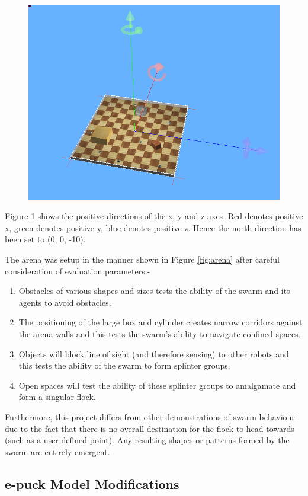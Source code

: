 \begin{figure}[!h]
	\centering
	\includegraphics[width=.6\linewidth]{sideways}
	\captionsetup{width=.7\textwidth}
	\label{fig:axes}
\end{figure}

Figure \ref{fig:axes} shows the positive directions of the x, y and z axes. Red denotes positive x, green denotes positive y, blue denotes positive z. Hence the north direction has been set to (0, 0, -10). \newline

The arena was setup in the manner shown in Figure \ref{fig:arena} after careful consideration of evaluation parameters:-

\begin{enumerate}
	\item Obstacles of various shapes and sizes tests the ability of the swarm and its agents to avoid obstacles.
	\item The positioning of the large box and cylinder creates narrow corridors against the arena walls and this tests the swarm's ability to navigate confined spaces.
	\item Objects will block line of sight (and therefore sensing) to other robots and this tests the ability of the swarm to form splinter groups.
	\item Open spaces will test the ability of these splinter groups to amalgamate and form a singular flock.
\end{enumerate}

Furthermore, this project differs from other demonstrations of swarm behaviour due to the fact that there is no overall destination for the flock to head towards (such as a user-defined point). Any resulting shapes or patterns formed by the swarm are entirely emergent.

\subsection{e-puck Model Modifications}
\label{subsection:mod-desc}


